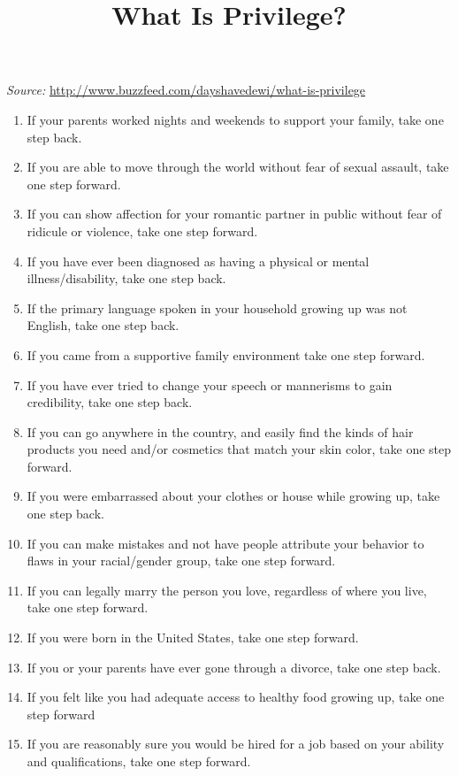 \documentclass[11pt, twoside]{article}
\title{What Is Privilege?}
\author{}
\date{}
\begin{document}
	\maketitle

	\begin{center}\textit{Source:} \url{http://www.buzzfeed.com/dayshavedewi/what-is-privilege}\end{center}

	\begin{enumerate}
		\item If your parents worked nights and weekends to support your family, take one step back.
		\item If you are able to move through the world without fear of sexual assault, take one step forward.
		\item If you can show affection for your romantic partner in public without fear of ridicule or violence, take one step forward.
		\item If you have ever been diagnosed as having a physical or mental illness/disability, take one step back.
		\item If the primary language spoken in your household growing up was not English, take one step back.
		\item If you came from a supportive family environment take one step forward.
		\item If you have ever tried to change your speech or mannerisms to gain credibility, take one step back.
		\item If you can go anywhere in the country, and easily find the kinds of hair products you need and/or cosmetics that match your skin color, take one step forward.
		\item If you were embarrassed about your clothes or house while growing up, take one step back.
		\item If you can make mistakes and not have people attribute your behavior to flaws in your racial/gender group, take one step forward.
		\item If you can legally marry the person you love, regardless of where you live, take one step forward.
		\item If you were born in the United States, take one step forward.
		\item If you or your parents have ever gone through a divorce, take one step back.
		\item If you felt like you had adequate access to healthy food growing up, take one step forward
		\item If you are reasonably sure you would be hired for a job based on your ability and qualifications, take one step forward.

\end{enumerate}
\end{document}
